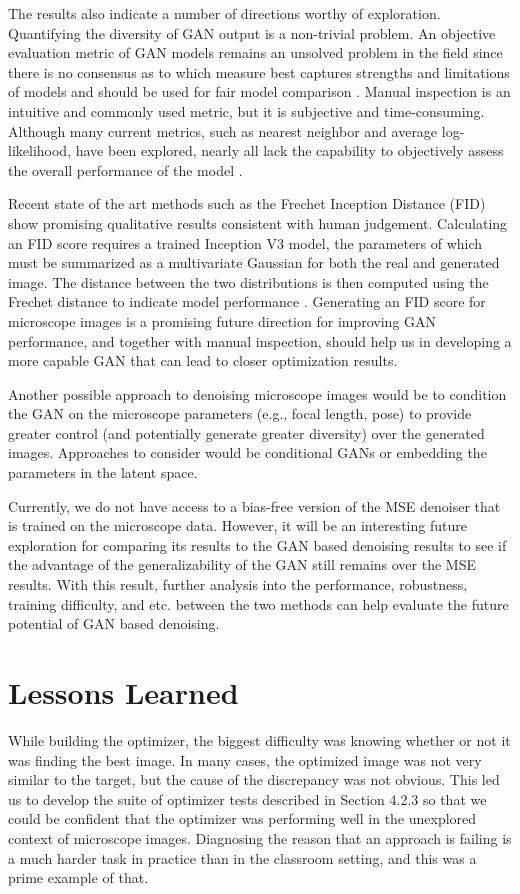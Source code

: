 \documentclass{article}
\begin{document}
The results also indicate a number of directions worthy of exploration. Quantifying the diversity of GAN output is a non-trivial problem. An objective evaluation metric of GAN models remains an unsolved problem in the field since there is no consensus as to which measure best captures strengths and limitations of models and should be used for fair model comparison \cite{GANeval}. Manual inspection is an intuitive and commonly used metric, but it is subjective and time-consuming. Although many current metrics, such as nearest neighbor and average log-likelihood, have been explored, nearly all lack the capability to objectively assess the overall performance of the model \cite{GANeval}. 

Recent state of the art methods such as the Frechet Inception Distance (FID) show promising qualitative results consistent with human judgement. Calculating an FID score requires a trained Inception V3 model, the parameters of which must be summarized as a multivariate Gaussian for both the real and generated image. The distance between the two distributions is then computed using the Frechet distance to indicate model performance \cite{TTUR}. Generating an FID score for microscope images is a promising future direction for improving GAN performance, and together with manual inspection, should help us in developing a more capable GAN that can lead to closer optimization results. 

Another possible approach to denoising microscope images would be to condition the GAN on the microscope parameters (e.g., focal length, pose) to provide greater control (and potentially generate greater diversity) over the generated images. Approaches to consider would be conditional GANs or embedding the parameters in the latent space.

Currently, we do not have access to a bias-free version of the MSE denoiser that is trained on the microscope data. However, it will be an interesting future exploration for comparing its results to the GAN based denoising results to see if the advantage of the generalizability of the GAN still remains over the MSE results. With this result, further analysis into the performance, robustness, training difficulty, and etc. between the two methods can help evaluate the future potential of GAN based denoising. 

\section{Lessons Learned}
While building the optimizer, the biggest difficulty was knowing whether or not it was finding the best image. In many cases, the optimized image was not very similar to the target, but the cause of the discrepancy was not obvious. This led us to develop the suite of optimizer tests described in Section 4.2.3 so that we could be confident that the optimizer was performing well in the unexplored context of microscope images. Diagnosing the reason that an approach is failing is a much harder task in practice than in the classroom setting, and this was a prime example of that.
\end{document}

